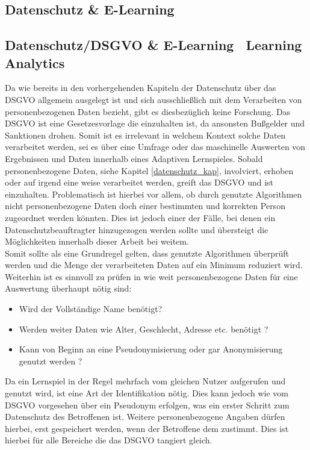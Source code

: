 \documentclass[a4paper, 12pt]{article}
\begin{document}
\subsection{Datenschutz \& E-Learning}

\subsection{Datenschutz/DSGVO \& E-Learning \ Learning Analytics}
Da wie bereits in den vorhergehenden Kapiteln der Datenschutz über das DSGVO allgemein ausgelegt ist und sich ausschließlich mit dem Verarbeiten von personenbezogenen Daten bezieht, gibt es diesbezüglich keine Forschung. Das DSGVO ist eine Gesetzesvorlage die einzuhalten ist, da ansonsten Bußgelder und Sanktionen drohen. Somit ist es irrelevant in welchem Kontext solche Daten verarbeitet werden, sei es über eine Umfrage oder das maschinelle Auswerten von Ergebnissen und Daten innerhalb eines Adaptiven Lernspieles. Sobald personenbezogene Daten, siehe Kapitel \ref{datenschutz_kap}, involviert, erhoben oder auf irgend eine weise verarbeitet werden, greift das DSGVO und ist einzuhalten. Problematisch ist hierbei vor allem, ob durch genutzte Algorithmen nicht personenbezogene Daten doch einer bestimmten und korrekten Person zugeordnet werden könnten. Dies ist jedoch einer der Fälle, bei denen ein Datenschutzbeauftragter hinzugezogen werden sollte und übersteigt die Möglichkeiten innerhalb dieser Arbeit bei weitem.\\ Somit sollte als eine Grundregel gelten, dass genutzte Algorithmen überprüft werden und die Menge der verarbeiteten Daten auf ein Minimum reduziert wird.\\Weiterhin ist es sinnvoll zu prüfen in wie weit personenbezogene Daten für eine Auswertung überhaupt nötig sind:
\begin{itemize}
	\item Wird der Vollständige Name benötigt?
	\item Werden weiter Daten wie Alter, Geschlecht, Adresse etc. benötigt ?
	\item Kann von Beginn an eine Pseudonymisierung oder gar Anonymisierung genutzt werden ?
\end{itemize}
Da ein Lernspiel in der Regel mehrfach vom gleichen Nutzer aufgerufen und genutzt wird, ist eine Art der Identifikation nötig. Dies kann jedoch wie vom DSGVO vorgesehen über ein Pseudonym erfolgen, was ein erster Schritt zum Datenschutz des Betroffenen ist. Weitere personenbezogene Angaben dürfen hierbei, erst gespeichert werden, wenn der Betroffene dem zustimmt. Dies ist hierbei für alle Bereiche die das DSGVO tangiert gleich.
\end{document}
